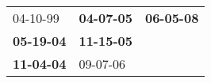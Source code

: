 \begin{supertabular}{p{0.33\columnwidth}p{0.33\columnwidth}p{0.33\columnwidth}}
          04-10-99\textsuperscript{} &  \textbf{04-07-05\textsuperscript{}} &  \textbf{06-05-08\textsuperscript{}} \\
 \textbf{05-19-04\textsuperscript{}} &  \textbf{11-15-05\textsuperscript{}} &                                      \\
 \textbf{11-04-04\textsuperscript{}} &           09-07-06\textsuperscript{} &                                      \\
\end{supertabular}
